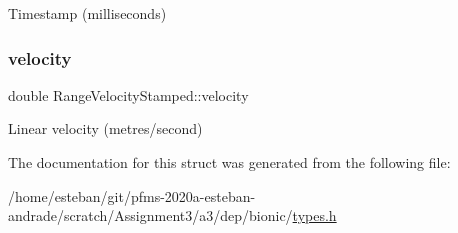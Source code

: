 Timestamp (milliseconds) \mbox{\label{structRangeVelocityStamped_a17777401a22b59317e92666f03f7fc88}} 
\subsubsection{\texorpdfstring{velocity}{velocity}}
{\footnotesize\ttfamily double Range\+Velocity\+Stamped\+::velocity}

Linear velocity (metres/second) 

The documentation for this struct was generated from the following file\+:\begin{DoxyCompactItemize}
\item 
/home/esteban/git/pfms-\/2020a-\/esteban-\/andrade/scratch/\+Assignment3/a3/dep/bionic/\hyperlink{bionic_2types_8h}{types.\+h}\end{DoxyCompactItemize}
